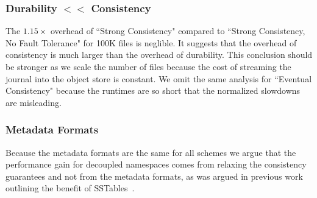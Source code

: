 \subsubsection{Durability \(<<\) Consistency} The \(1.15\times\) overhead of
``Strong Consistency" compared to ``Strong Consistency, No Fault Tolerance" for
100K files is neglible. It suggests that the overhead of consistency is much
larger than the overhead of durability. This conclusion should be stronger as
we scale the number of files because the cost of streaming the journal into the
object store is constant. We omit the same analysis for ``Eventual Consistency"
because the runtimes are so short that the normalized slowdowns are misleading.

\subsubsection{Metadata Formats} Because the metadata formats are the same for
all schemes we argue that the performance gain for decoupled namespaces comes
from relaxing the consistency guarantees and not from the metadata formats, as
was argued in previous work outlining the benefit of
SSTables~\cite{ren:atc2013-tablefs, ren:sc2014-indexfs}.

